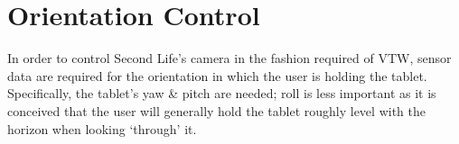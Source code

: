 

\section{Orientation Control}

\label{OrientationControl}

\newcommand{\ArduinoFootnote}{\footnote{\url{http://www.arduino.cc/}}}

\newcommand{\MMAfootnote}{\footnote{\url{http://cache.freescale.com/files/sensors/doc/data_sheet/MMA8452Q.pdf}}}

\newcommand{\ADXLfootnote}{\footnote{\url{http://www.analog.com/static/imported-files/data_sheets/ADXL335.pdf}}}

\newcommand{\HMCfootnote}{\footnote{\url{http://www51.honeywell.com/aero/common/documents/myaerospacecatalog-documents/Defense_Brochures-documents/HMC5883L_3-Axis_Digital_Compass_IC.pdf}}}

\newcommand{\HMCtwoFootnote}{\footnote{\url{http://www51.honeywell.com/aero/common/documents/myaerospacecatalog-documents/Missiles-Munitions/HMC6343.pdf}}}

\newcommand{\HMCvccFootnote}{\footnote{The HMC6343 requires 2.7 to 3.6V input on VCC/VDD, this table showing connection to 5V assumes a HMC6343 breakout with appropriate step down.}}

\newcommand{\itwocFootnote}{\footnote{The HMC6343's I2C lines must be pulled up to 3.3V, this table shows connection to an Arduino Uno R3's I2C lines which are pulled up to 5V assuming a HMC6343 breakout with appropriate level shifters.}}



In order to control Second Life's camera in the fashion required of VTW, sensor data are required for the orientation in which the user is holding the tablet. Specifically, the tablet's yaw \& pitch are needed; roll is less important as it is conceived that the user will generally hold the tablet roughly level with the horizon when looking `through' it.

